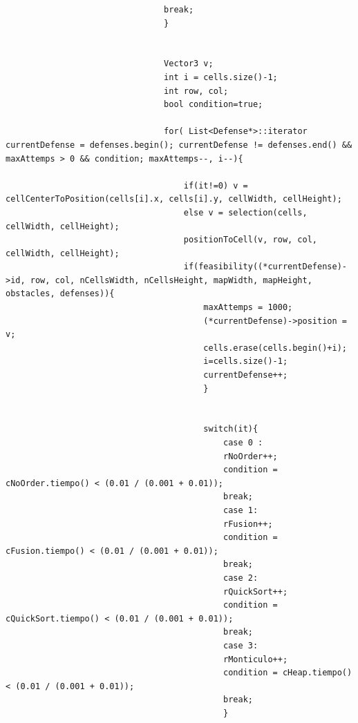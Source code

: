 \begin{lstlisting}
                                break;
                                }
                                
                                
                                Vector3 v;
                                int i = cells.size()-1;
                                int row, col;
                                bool condition=true;
                                
                                for( List<Defense*>::iterator currentDefense = defenses.begin(); currentDefense != defenses.end() && maxAttemps > 0 && condition; maxAttemps--, i--){
                                    
                                    if(it!=0) v = cellCenterToPosition(cells[i].x, cells[i].y, cellWidth, cellHeight);
                                    else v = selection(cells, cellWidth, cellHeight);
                                    positionToCell(v, row, col, cellWidth, cellHeight);
                                    if(feasibility((*currentDefense)->id, row, col, nCellsWidth, nCellsHeight, mapWidth, mapHeight, obstacles, defenses)){
                                        maxAttemps = 1000;
                                        (*currentDefense)->position = v;
                                        cells.erase(cells.begin()+i);
                                        i=cells.size()-1;
                                        currentDefense++;
                                        } 
                                        
                                        
                                        switch(it){
                                            case 0 :
                                            rNoOrder++;
                                            condition = cNoOrder.tiempo() < (0.01 / (0.001 + 0.01));
                                            break;
                                            case 1: 
                                            rFusion++;
                                            condition = cFusion.tiempo() < (0.01 / (0.001 + 0.01));
                                            break;
                                            case 2:   
                                            rQuickSort++;
                                            condition = cQuickSort.tiempo() < (0.01 / (0.001 + 0.01));
                                            break;
                                            case 3: 
                                            rMonticulo++;
                                            condition = cHeap.tiempo() < (0.01 / (0.001 + 0.01));
                                            break;
                                            }
                                            

\end{lstlisting}
